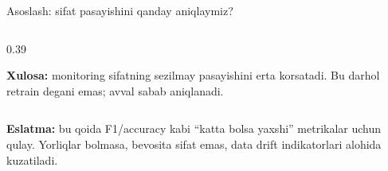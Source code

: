 \documentclass[aspectratio=169,11pt]{beamer}
\newcommand{\uzq}{\textquotesingle{}}   %
\begin{document}
\begin{frame}{Asoslash: sifat pasayishini qanday aniqlaymiz?}
\begin{columns}[T,totalwidth=\textwidth]
\begin{column}{0.39\textwidth}
      \vspace{-5pt}

      \begin{tcolorbox}[okbox,top=2pt,bottom=2pt,left=4pt,right=4pt]
        \footnotesize
        \textbf{Xulosa:}
        monitoring sifatning sezilmay pasayishini erta ko\uzq{}rsatadi.
        Bu darhol retrain degani emas; avval sabab aniqlanadi.
      \end{tcolorbox}
    \end{column}
  \end{columns}

  \vspace{2pt}
  {\scriptsize
  \textbf{Eslatma:} bu qoida F1/accuracy kabi ``katta bo\uzq{}lsa yaxshi''
  metrikalar uchun qulay. Yorliqlar bo\uzq{}lmasa, bevosita sifat emas,
  data drift indikatorlari alohida kuzatiladi.
  }
\end{frame}
\end{document}
